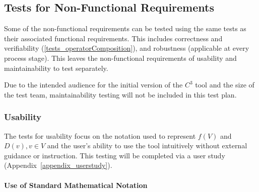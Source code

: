 \documentclass[12pt, titlepage]{article}
\newcommand{\prognameAbbrv}{$C^{3}$}
\begin{document}
\subsection{Tests for Non-Functional Requirements}
\label{testplan_nonfunctional}

Some of the non-functional requirements can be tested using the same tests as 
their associated functional requirements. This includes correctness 
and verifiability (\ref{tests_operatorComposition}), and robustness (applicable 
at every process stage). This leaves the non-functional requirements of 
usability and maintainability to test separately. 

Due to the intended audience for the initial version of the \prognameAbbrv{} 
tool and the size of the test team, maintainability testing will not be 
included in this test plan.

\subsubsection{Usability}
\label{tests_nonfunctional_usability}
The tests for usability focus on the notation used to represent $f(V)$ and 
$D(v), v \in V$ and the user's ability to use the tool intuitively without 
external guidance or instruction. This testing will be completed via a user 
study (Appendix~\ref{appendix_userstudy}).

\paragraph{Use of Standard Mathematical Notation}
\end{document}
